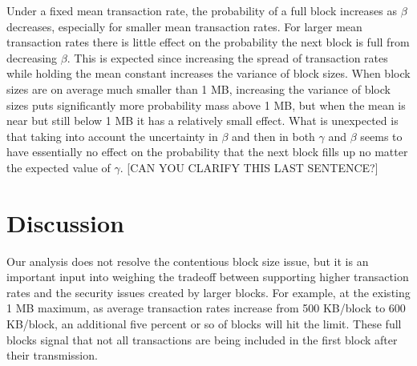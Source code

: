 \documentclass{article}
\begin{document}
Under a fixed mean transaction rate, the probability of a full block increases as $\beta$ decreases, especially for smaller mean transaction rates. For larger mean transaction rates there is little effect on the probability the next block is full from decreasing $\beta$. This is expected since increasing the spread of transaction rates while holding the mean constant increases the variance of block sizes. When block sizes are on average much smaller than 1 MB, increasing the variance of block sizes puts significantly more probability mass above 1 MB, but when the mean is near but still below 1 MB it has a relatively small effect. What is unexpected is that taking into account the uncertainty in $\beta$ and then in both $\gamma$ and $\beta$ seems to have essentially no effect on the probability that the next block fills up no matter the expected value of $\gamma$. [CAN YOU CLARIFY THIS LAST SENTENCE?]



\section{Discussion}
Our analysis does not resolve the contentious block size issue, but it is an important input into weighing the tradeoff between supporting higher transaction rates and the security issues created by larger blocks. For example, at the existing 1 MB maximum, as average transaction rates increase from 500 KB/block to 600 KB/block, an additional five percent or so of blocks will hit the limit. These full blocks signal that not all transactions are being included in the first block after their transmission.
\end{document}
